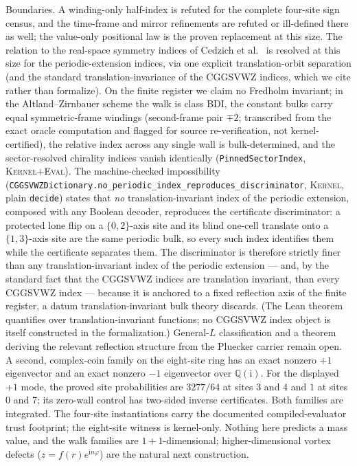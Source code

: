 \documentclass[11pt]{article}
\newcommand{\ii}{\mathrm{i}}
\newcommand{\Kernel}{\textcolor{kernelcolor}{\textsc{Kernel}}}
\newcommand{\DraftTrust}{\textcolor{draftcolor}{\textsc{Kernel+Eval}}}
\begin{document}
Boundaries.  A winding-only half-index is refuted for the complete
four-site sign census, and the time-frame and mirror refinements are
refuted or ill-defined there as well; the value-only positional law is
the proven replacement at this size.  The relation to the real-space
symmetry indices of Cedzich et al.\ \cite{Cedzich,CedzichBulkEdge} is
resolved at this size for the periodic-extension indices, via one
explicit translation-orbit separation (and the standard
translation-invariance of the CGGSVWZ indices, which we cite rather than
formalize).  On the finite register we claim no Fredholm invariant; in
the Altland--Zirnbauer scheme the walk is class BDI, the constant bulks
carry equal symmetric-frame windings (second-frame pair $\mp2$;
transcribed from the exact oracle computation and flagged for source
re-verification, not kernel-certified), the relative index across any
single wall is bulk-determined, and the sector-resolved chirality
indices vanish identically (\texttt{PinnedSectorIndex}, \DraftTrust{}).  The machine-checked impossibility
(\texttt{CGGSVWZDictionary.no\_periodic\_index\_reproduces\_discriminator},
\Kernel{}, plain \texttt{decide}) states that \emph{no}
translation-invariant index of the periodic extension, composed with any
Boolean decoder, reproduces the certificate discriminator: a protected
lone flip on a $\{0,2\}$-axis site and its blind one-cell translate onto
a $\{1,3\}$-axis site are the same periodic bulk, so every such index
identifies them while the certificate separates them.  The
discriminator is therefore strictly finer than any translation-invariant
index of the periodic extension --- and, by the standard fact that the
CGGSVWZ indices are translation invariant, than every CGGSVWZ index ---
because it is anchored to a fixed reflection axis of the finite
register, a datum translation-invariant bulk theory discards.  (The
Lean theorem quantifies over translation-invariant functions; no CGGSVWZ
index object is itself constructed in the formalization.)  General-$L$
classification and a theorem deriving the relevant reflection structure
from the Pluecker carrier remain open.  A second, complex-coin family on the eight-site ring has an
exact nonzero $+1$ eigenvector and an exact nonzero $-1$ eigenvector over
$\mathbb{Q}(\mathrm{i})$.  For the displayed $+1$ mode, the proved site
probabilities are $3277/64$ at sites 3 and 4 and $1$ at sites 0 and 7; its
zero-wall control has two-sided inverse certificates.  Both families are
integrated.  The four-site instantiations carry the documented
compiled-evaluator trust footprint; the eight-site witness is kernel-only.
Nothing here predicts a mass value, and the walk families are
$1{+}1$-dimensional; higher-dimensional vortex defects
($z=f(r)e^{\ii n\varphi}$) are the natural next construction.
\end{document}
